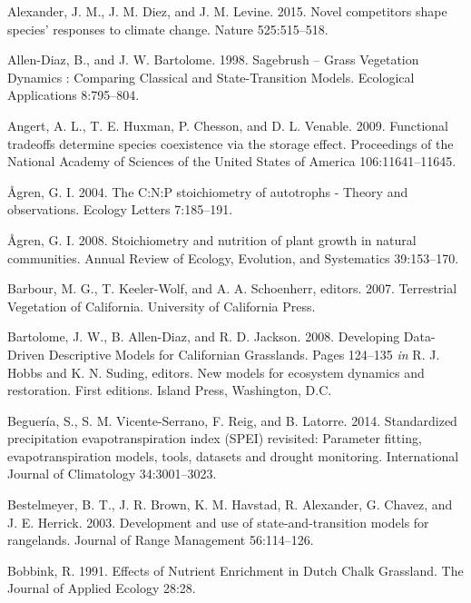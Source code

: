 \documentclass[twoside,12pt,final]{ucthesis-CA2012}
\begin{document}
\begin{ucmainmatter}
\leavevmode\hypertarget{ref-Alexander2015}{}%
Alexander, J. M., J. M. Diez, and J. M. Levine. 2015. Novel competitors shape species' responses to climate change. Nature 525:515--518.

\leavevmode\hypertarget{ref-Allen-Diaz1998}{}%
Allen-Diaz, B., and J. W. Bartolome. 1998. Sagebrush -- Grass Vegetation Dynamics : Comparing Classical and State-Transition Models. Ecological Applications 8:795--804.

\leavevmode\hypertarget{ref-Angert2009}{}%
Angert, A. L., T. E. Huxman, P. Chesson, and D. L. Venable. 2009. Functional tradeoffs determine species coexistence via the storage effect. Proceedings of the National Academy of Sciences of the United States of America 106:11641--11645.

\leavevmode\hypertarget{ref-Agren2004}{}%
Ågren, G. I. 2004. The C:N:P stoichiometry of autotrophs - Theory and observations. Ecology Letters 7:185--191.

\leavevmode\hypertarget{ref-Agren2008}{}%
Ågren, G. I. 2008. Stoichiometry and nutrition of plant growth in natural communities. Annual Review of Ecology, Evolution, and Systematics 39:153--170.

\leavevmode\hypertarget{ref-Barbour2007}{}%
Barbour, M. G., T. Keeler-Wolf, and A. A. Schoenherr, editors. 2007. Terrestrial Vegetation of California. University of California Press.

\leavevmode\hypertarget{ref-Bartolome2008}{}%
Bartolome, J. W., B. Allen-Diaz, and R. D. Jackson. 2008. Developing Data-Driven Descriptive Models for Californian Grasslands. Pages 124--135 \emph{in} R. J. Hobbs and K. N. Suding, editors. New models for ecosystem dynamics and restoration. First editions. Island Press, Washington, D.C.

\leavevmode\hypertarget{ref-Begueria2014}{}%
Beguería, S., S. M. Vicente-Serrano, F. Reig, and B. Latorre. 2014. Standardized precipitation evapotranspiration index (SPEI) revisited: Parameter fitting, evapotranspiration models, tools, datasets and drought monitoring. International Journal of Climatology 34:3001--3023.

\leavevmode\hypertarget{ref-Bestelmeyer2003}{}%
Bestelmeyer, B. T., J. R. Brown, K. M. Havstad, R. Alexander, G. Chavez, and J. E. Herrick. 2003. Development and use of state-and-transition models for rangelands. Journal of Range Management 56:114--126.

\leavevmode\hypertarget{ref-Bobbink1991}{}%
Bobbink, R. 1991. Effects of Nutrient Enrichment in Dutch Chalk Grassland. The Journal of Applied Ecology 28:28.


\end{ucmainmatter}
\end{document}
